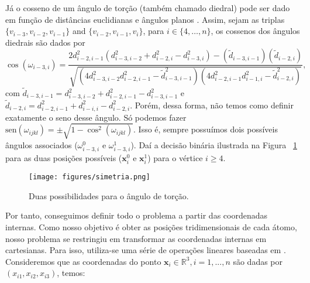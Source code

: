 Já o cosseno de um ângulo de torção (também chamado diedral) pode ser dado em função de distâncias euclidianas e ângulos planos \cite{carlileTese}. Assim, sejam as triplas $\{ v_{i-3} , v_{i-2} , v_{i-1} \}$ and $\{ v_{i-2} , v_{i-1},v_{i} \}$, para $i \in \{ 4 , \hdots , n \}$, os cossenos dos ângulos diedrais são dados por
\begin{equation}
	\cos( \omega_{i-3,i} ) = 
	\dfrac{ 2d^{2}_{i-2,i-1} 
		\left( d^{2}_{i-3,i-2} + d^{2}_{i-2,i} - d^{2}_{i-3,i} \right) - (\tilde{d}_{i-3,i-1})(\tilde{d}_{i-2,i}) }
	{ \sqrt{\left( 4d^{2}_{i-3,i-2}d^{2}_{i-2,i-1} - \tilde{d}^{2}_{i-3,i-1}\right) 
			\left( 4d^{2}_{i-2,i-1}d^{2}_{i-1,i} - \tilde{d}^{2}_{i-2,i} \right)} },
	\label{eqcosomega}
\end{equation}
com $\tilde{d}_{i-3,i-1} = d^{2}_{i-3,i-2} + d^{2}_{i-2,i-1} - d^{2}_{i-3,i-1}$ e $\tilde{d}_{i-2,i} = d^{2}_{i-2,i-1} + d^{2}_{i-i,i} - d^{2}_{i-2,i}$. Porém, dessa forma, não temos como definir exatamente o seno desse ângulo. Só podemos fazer $\mbox{sen}(\omega_{ijkl}) = \pm\sqrt{1 - \cos^2(\omega_{ijkl})} \label{eq:senOmega}$. Isso é, sempre possuímos dois possíveis ângulos associados ($\omega_{i-3, i}^0$ e $\omega_{i-3,i}^1$). Daí a decisão binária ilustrada na Figura ~\ref{fig:torcao} para as duas posições possíveis ($\mathbf{x}_i^0$ e $\mathbf{x}_i^1$) para o vértice $i\geq 4$.

\begin{figure}[H]
	\begin{center}
		\texttt{[image: figures/simetria.png]}
	\end{center}
	\caption{Duas possibilidades para o ângulo de torção.}
	\label{fig:torcao}
\end{figure}

Por tanto, conseguimos definir todo o problema a partir das coordenadas internas. Como nosso objetivo é obter as posições tridimensionais de cada átomo, nosso problema se restringiu em transformar as coordenadas internas em cartesianas. Para isso, utiliza-se uma série de operações lineares baseadas em \cite{thompsonBi}.
\\

Consideremos que as coordenadas do ponto $\mathbf x_{i} \in\mathbb{R}^3,i= 1, ...,n $ são dadas por $(x_{i1},x_{i2},x_{i3})$, temos:

